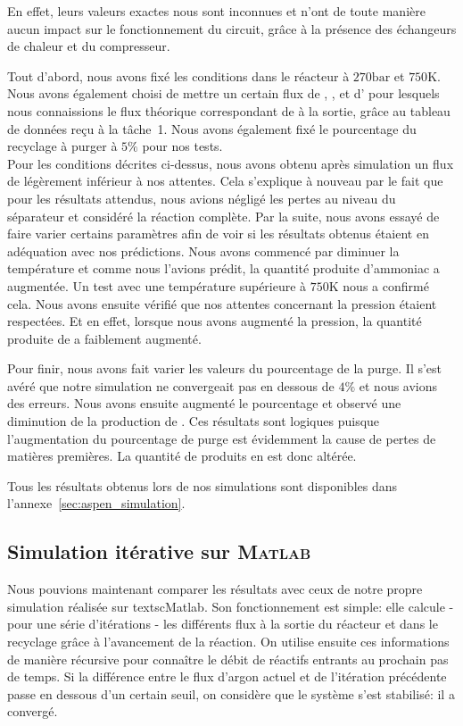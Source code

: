 En effet, leurs valeurs exactes nous sont inconnues et n'ont de toute manière 
aucun impact sur le fonctionnement du circuit, grâce à la présence des échangeurs de chaleur 
et du compresseur.

Tout d'abord, nous avons fixé les conditions dans le réacteur à $270\si{\bar}$ 
et $750\si{\kelvin}$. 
Nous avons également choisi de mettre un certain flux de , , et d'  
pour lesquels nous connaissions le flux théorique correspondant de  à la sortie,
grâce au tableau de données reçu à la tâche~1. 
Nous avons également fixé le pourcentage du recyclage à purger à $5\%$ pour nos tests.\\

Pour les conditions décrites ci-dessus, 
nous avons obtenu après simulation un flux de  légèrement inférieur à nos attentes. 
Cela s'explique à nouveau par le fait que pour les résultats attendus, 
nous avions négligé les pertes au niveau du séparateur et considéré la réaction complète.
Par la suite, nous avons essayé de faire varier certains paramètres afin 
de voir si les résultats obtenus étaient en adéquation avec nos prédictions. 
Nous avons commencé par diminuer la température et comme nous l'avions prédit, 
la quantité produite d'ammoniac a augmentée. 
Un test avec une température supérieure à $750\si{\kelvin}$ nous a confirmé cela. 
Nous avons ensuite vérifié que nos attentes concernant la pression étaient respectées. 
Et en effet, lorsque nous avons augmenté la pression, 
la quantité produite de  a faiblement augmenté.

Pour finir, nous avons fait varier les valeurs du pourcentage de la purge.
Il s'est avéré que notre simulation ne convergeait pas en dessous de $4\%$ 
et nous avions des erreurs.
Nous avons ensuite augmenté le pourcentage 
et observé une diminution de la production de . 
Ces résultats sont logiques puisque l'augmentation du pourcentage 
de purge est évidemment la cause de pertes de matières premières. 
La quantité de produits en est donc altérée.

Tous les résultats obtenus lors de nos simulations 
sont disponibles dans l'annexe~\ref{sec:aspen_simulation}.

\subsection{Simulation itérative sur \textsc{Matlab}}

Nous pouvions maintenant comparer les résultats
avec ceux de notre propre simulation réalisée sur
textsc{Matlab}. Son fonctionnement est simple:
elle calcule - pour une série d'itérations - 
les différents flux à la sortie du réacteur 
et dans le recyclage grâce à l'avancement de
la réaction. On utilise ensuite ces informations 
de manière récursive pour connaître le débit de 
réactifs entrants au prochain pas de temps. Si 
la différence entre le flux d'argon actuel et 
de l'itération précédente passe en dessous d'un 
certain seuil, on considère que le système s'est 
stabilisé: il a convergé.

